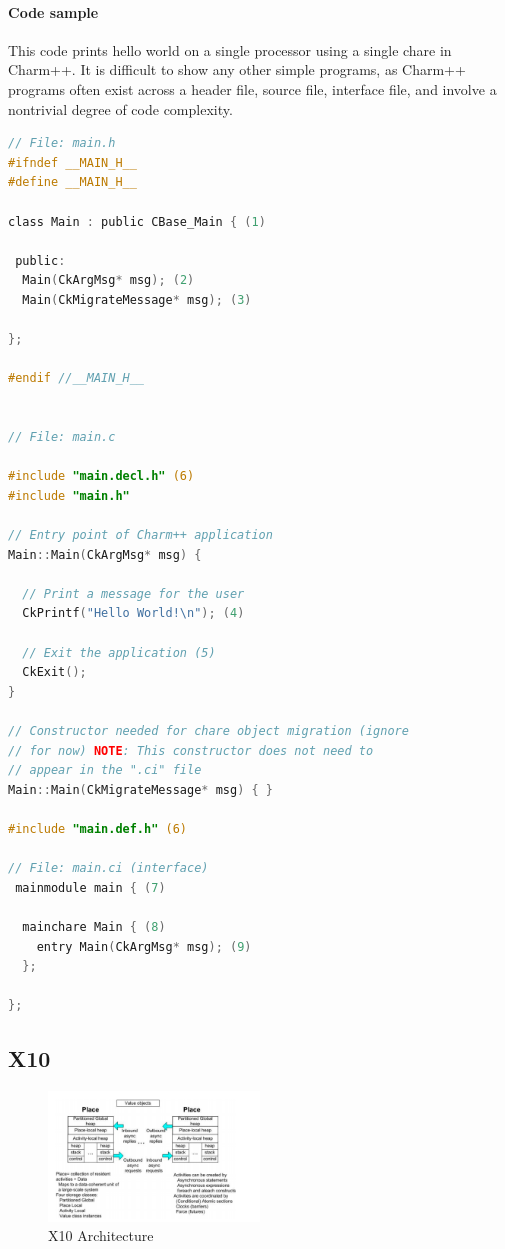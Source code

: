 {\begin{itemize}
	\end{itemize}

\paragraph{Code sample}
This code prints hello world on a single processor using a single chare in Charm++. It is difficult to show any other simple programs, as Charm++ programs often exist across a header file, source file, interface file, and involve a nontrivial degree of code complexity.
\scriptsize
\begin{lstlisting}[language=C, caption=Hello World in Charm++ from \cite{charm_tutorial}, captionpos=b]
// File: main.h
#ifndef __MAIN_H__
#define __MAIN_H__

class Main : public CBase_Main { (1)

 public:
  Main(CkArgMsg* msg); (2)
  Main(CkMigrateMessage* msg); (3)

};

#endif //__MAIN_H__


// File: main.c

#include "main.decl.h" (6)
#include "main.h"

// Entry point of Charm++ application
Main::Main(CkArgMsg* msg) {

  // Print a message for the user
  CkPrintf("Hello World!\n"); (4)

  // Exit the application (5)
  CkExit();
}

// Constructor needed for chare object migration (ignore
// for now) NOTE: This constructor does not need to
// appear in the ".ci" file
Main::Main(CkMigrateMessage* msg) { }

#include "main.def.h" (6)
	
// File: main.ci (interface)
 mainmodule main { (7)

  mainchare Main { (8)
    entry Main(CkArgMsg* msg); (9)
  };

};

\end{lstlisting}%

\normalsize

\subsection{X10}
    \begin{figure}[ht]
		\centering
		\includegraphics[width=0.50\textwidth]{Figures/x10_arch.png}
		\caption{X10 Architecture \cite{X10_2005}}
        \label{fig:x10_arch}
    \end{figure}
}
